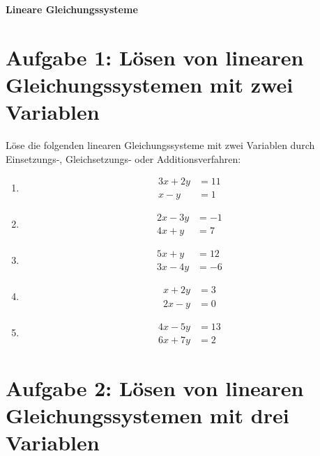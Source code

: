 \begin{center}
    \textbf{Lineare Gleichungssysteme}
\end{center}

\section*{\small Aufgabe 1: Lösen von linearen Gleichungssystemen mit zwei Variablen}

Löse die folgenden linearen Gleichungssysteme mit zwei Variablen durch Einsetzungs-, Gleichsetzungs- oder Additionsverfahren:

\begin{enumerate}[1)]
    \item 
    \[
    \begin{aligned}
        3x + 2y &= 11 \\
        x - y &= 1
    \end{aligned}
    \]
    
    \item 
    \[
    \begin{aligned}
        2x - 3y &= -1 \\
        4x + y &= 7
    \end{aligned}
    \]
    
    \item 
    \[
    \begin{aligned}
        5x + y &= 12 \\
        3x - 4y &= -6
    \end{aligned}
    \]
    
    \item 
    \[
    \begin{aligned}
        x + 2y &= 3 \\
        2x - y &= 0
    \end{aligned}
    \]
    
    \item 
    \[
    \begin{aligned}
        4x - 5y &= 13 \\
        6x + 7y &= 2
    \end{aligned}
    \]
\end{enumerate}

\section*{\small Aufgabe 2: Lösen von linearen Gleichungssystemen mit drei Variablen}

